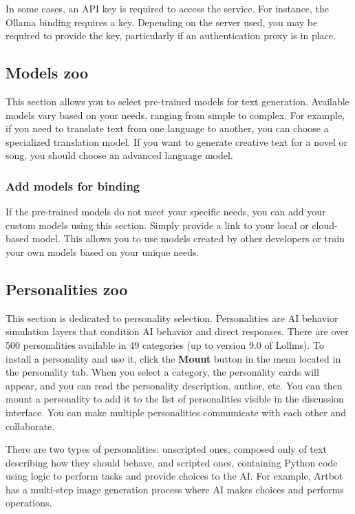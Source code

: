 \documentclass{article}
\begin{document}
In some cases, an API key is required to access the service. For instance, the Ollama binding requires a key. Depending on the server used, you may be required to provide the key, particularly if an authentication proxy is in place.

\subsection{Models zoo}

This section allows you to select pre-trained models for text generation. Available models vary based on your needs, ranging from simple to complex. For example, if you need to translate text from one language to another, you can choose a specialized translation model. If you want to generate creative text for a novel or song, you should choose an advanced language model.

\subsubsection{Add models for binding}

If the pre-trained models do not meet your specific needs, you can add your custom models using this section. Simply provide a link to your local or cloud-based model. This allows you to use models created by other developers or train your own models based on your unique needs.

\subsection{Personalities zoo}

This section is dedicated to personality selection. Personalities are AI behavior simulation layers that condition AI behavior and direct responses. There are over 500 personalities available in 49 categories (up to version 9.0 of Lollms). To install a personality and use it, click the \textbf{Mount} button in the menu located in the personality tab. When you select a category, the personality cards will appear, and you can read the personality description, author, etc. You can then mount a personality to add it to the list of personalities visible in the discussion interface. You can make multiple personalities communicate with each other and collaborate.

There are two types of personalities: unscripted ones, composed only of text describing how they should behave, and scripted ones, containing Python code using logic to perform tasks and provide choices to the AI. For example, Artbot has a multi-step image generation process where AI makes choices and performs operations.
\end{document}
